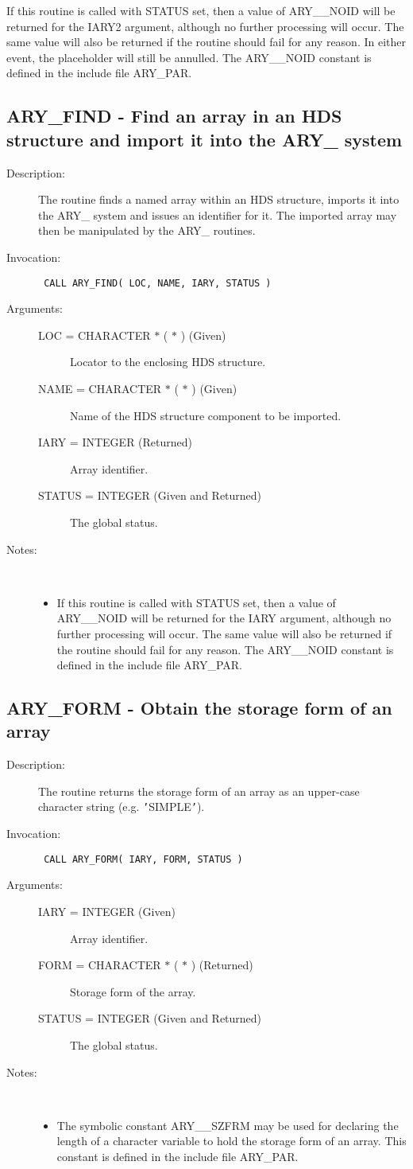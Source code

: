 \documentclass[twoside,11pt]{article}
\newcommand{\xlabel}[1]{}
\newlength{\sstbannerlength}
\newlength{\sstcaptionlength}
\newlength{\sstexampleslength}
\newlength{\sstexampleswidth}
\newcommand{\sstroutine}[3]{
   \goodbreak
   \rule{\textwidth}{0.5mm}
   \vspace{-7ex}
   \newline
   \settowidth{\sstbannerlength}{{\Large {\bf #1}}}
   \setlength{\sstcaptionlength}{\textwidth}
   \setlength{\sstexampleslength}{\textwidth}
   \addtolength{\sstbannerlength}{0.5em}
   \addtolength{\sstcaptionlength}{-2.0\sstbannerlength}
   \addtolength{\sstcaptionlength}{-5.0pt}
   \settowidth{\sstexampleswidth}{{\bf Examples:}}
   \addtolength{\sstexampleslength}{-\sstexampleswidth}
   \parbox[t]{\sstbannerlength}{\flushleft{\Large {\bf #1}}}
   \parbox[t]{\sstcaptionlength}{\center{\Large #2}}
   \parbox[t]{\sstbannerlength}{\flushright{\Large {\bf #1}}}
   \begin{description}
      #3
   \end{description}
}
\newcommand{\sstdescription}[1]{\item[Description:] #1}
\newcommand{\sstinvocation}[1]{\item[Invocation:]\hspace{0.4em}{\tt #1}}
\newcommand{\sstarguments}[1]{
   \item[Arguments:] \mbox{} \\
   \vspace{-3.5ex}
   \begin{description}
      #1
   \end{description}
}
\newcommand{\sstsubsection}[1]{ \item[{#1}] \mbox{} \\}
\newcommand{\sstnotes}[1]{\item[Notes:] \mbox{} \\[1.3ex] #1}
\newcommand{\sstitemlist}[1]{
  \mbox{} \\
  \vspace{-3.5ex}
  \begin{itemize}
     #1
  \end{itemize}
}
\newcommand{\sstitem}{\item}
\newcommand{\ssttt}{\tt}
\renewcommand{\sstroutine}[3]{
      \subsection{#1\xlabel{#1}-\label{#1}#2}
      \begin{description}
         #3
      \end{description}
   }
\renewcommand{\sstdescription}[1]{\item[Description:]
      \begin{description}
         #1
      \end{description}
   }
\renewcommand{\sstinvocation}[1]{\item[Invocation:]
      \begin{description}
         {\ssttt #1}
      \end{description}
   }
\renewcommand{\sstarguments}[1]{
      \item[Arguments:]
      \begin{description}
         #1
      \end{description}
   }
\renewcommand{\sstsubsection}[1]{\item[{#1}]}
\renewcommand{\sstnotes}[1]{\item[Notes:]
      \begin{description}
         #1
      \end{description}
   }
\newcommand{\sstitemlist}[1]{
      \begin{itemize}
         #1
      \end{itemize}
   }
\begin{document}
\begin{eqn*}
{{{         \sstitem
         If this routine is called with STATUS set, then a value of
         ARY\_\_NOID will be returned for the IARY2 argument, although no
         further processing will occur. The same value will also be
         returned if the routine should fail for any reason.  In either
         event, the placeholder will still be annulled. The ARY\_\_NOID
         constant is defined in the include file ARY\_PAR.
      }
   }
}
\sstroutine{
   ARY\_FIND
}{
   Find an array in an HDS structure and import it into the ARY\_
   system
}{
   \sstdescription{
      The routine finds a named array within an HDS structure, imports
      it into the ARY\_ system and issues an identifier for it. The
      imported array may then be manipulated by the ARY\_ routines.
   }
   \sstinvocation{
      CALL ARY\_FIND( LOC, NAME, IARY, STATUS )
   }
   \sstarguments{
      \sstsubsection{
         LOC = CHARACTER $*$ ( $*$ ) (Given)
      }{
         Locator to the enclosing HDS structure.
      }
      \sstsubsection{
         NAME = CHARACTER $*$ ( $*$ ) (Given)
      }{
         Name of the HDS structure component to be imported.
      }
      \sstsubsection{
         IARY = INTEGER (Returned)
      }{
         Array identifier.
      }
      \sstsubsection{
         STATUS = INTEGER (Given and Returned)
      }{
         The global status.
      }
   }
   \sstnotes{
      \sstitemlist{

         \sstitem
         If this routine is called with STATUS set, then a value of
         ARY\_\_NOID will be returned for the IARY argument, although no
         further processing will occur. The same value will also be
         returned if the routine should fail for any reason. The ARY\_\_NOID
         constant is defined in the include file ARY\_PAR.
      }
   }
}
\sstroutine{
   ARY\_FORM
}{
   Obtain the storage form of an array
}{
   \sstdescription{
      The routine returns the storage form of an array as an upper-case
      character string (e.g. {\tt '}SIMPLE{\tt '}).
   }
   \sstinvocation{
      CALL ARY\_FORM( IARY, FORM, STATUS )
   }
   \sstarguments{
      \sstsubsection{
         IARY = INTEGER (Given)
      }{
         Array identifier.
      }
      \sstsubsection{
         FORM = CHARACTER $*$ ( $*$ ) (Returned)
      }{
         Storage form of the array.
      }
      \sstsubsection{
         STATUS = INTEGER (Given and Returned)
      }{
         The global status.
      }
   }
   \sstnotes{
      \sstitemlist{

         \sstitem
         The symbolic constant ARY\_\_SZFRM may be used for declaring the
         length of a character variable to hold the storage form of an
         array. This constant is defined in the include file ARY\_PAR.

}}}
\end{eqn*}
\end{document}
